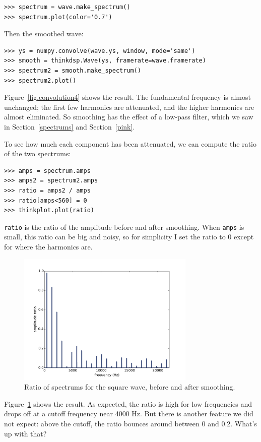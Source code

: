 \documentclass[12pt]{book}
\begin{document}
\begin{verbatim}
>>> spectrum = wave.make_spectrum()
>>> spectrum.plot(color='0.7')
\end{verbatim}

Then the smoothed wave:

\begin{verbatim}
>>> ys = numpy.convolve(wave.ys, window, mode='same')
>>> smooth = thinkdsp.Wave(ys, framerate=wave.framerate)
>>> spectrum2 = smooth.make_spectrum()
>>> spectrum2.plot()
\end{verbatim}

Figure~\ref{fig.convolution4} shows the result.  The fundamental
frequency is almost unchanged; the first few harmonics are
attenuated, and the higher harmonics are almost eliminated.  So
smoothing has the effect of a low-pass filter, which we
saw in Section~\ref{spectrums} and Section~\ref{pink}.

To see how much each component has been attenuated, we can
compute the ratio of the two spectrums:

\begin{verbatim}
>>> amps = spectrum.amps
>>> amps2 = spectrum2.amps
>>> ratio = amps2 / amps    
>>> ratio[amps<560] = 0
>>> thinkplot.plot(ratio)
\end{verbatim}

{\tt ratio} is the ratio of the amplitude before and after 
smoothing.  When {\tt amps} is small, this ratio can be big
and noisy, so for simplicity I set the ratio to 0 except for
where the harmonics are.

\begin{figure}
\centerline{\includegraphics[height=2.5in]{figs/convolution5.pdf}}
\caption{Ratio of spectrums for the square wave, before and after smoothing.}
\label{fig.convolution5}
\end{figure}

Figure~\ref{fig.convolution5} shows the result.  As expected, the
ratio is high for low frequencies and drops off at a cutoff frequency
near 4000 Hz.  But there is another feature we did not expect: above
the cutoff, the ratio bounces around between 0 and 0.2.
What's up with that?
\end{document}
